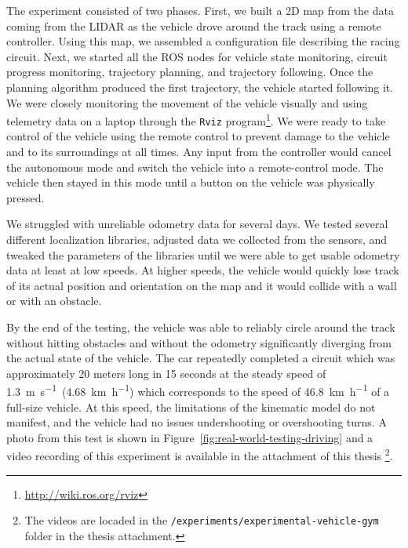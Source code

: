 The experiment consisted of two phases. First, we built a 2D map from the data coming from the \gls*{LIDAR} as the vehicle drove around the track using a remote controller. Using this map, we assembled a configuration file describing the racing circuit. Next, we started all the \gls{ROS} nodes for vehicle state monitoring, circuit progress monitoring, trajectory planning, and trajectory following. Once the planning algorithm produced the first trajectory, the vehicle started following it. We were closely monitoring the movement of the vehicle visually and using telemetry data on a laptop through the \texttt{Rviz} program\footnote{\url{http://wiki.ros.org/rviz}}. We were ready to take control of the vehicle using the remote control to prevent damage to the vehicle and to its surroundings at all times. Any input from the controller would cancel the autonomous mode and switch the vehicle into a remote-control mode. The vehicle then stayed in this mode until a button on the vehicle was physically pressed.

We struggled with unreliable odometry data for several days. We tested several different localization libraries, adjusted data we collected from the sensors, and tweaked the parameters of the libraries until we were able to get usable odometry data at least at low speeds. At higher speeds, the vehicle would quickly lose track of its actual position and orientation on the map and it would collide with a wall or with an obstacle.

By the end of the testing, the vehicle was able to reliably circle around the track without hitting obstacles and without the odometry significantly diverging from the actual state of the vehicle. The car repeatedly completed a circuit which was approximately 20 meters long in 15 seconds at the steady speed of \SI{1.3}{\meter\per\second}~(\SI{4.68}{\kilo\meter\per\hour}) which corresponds to the speed of \SI{46.8}{\kilo\meter\per\hour} of a full-size vehicle. At this speed, the limitations of the kinematic model do not manifest, and the vehicle had no issues undershooting or overshooting turns. A photo from this test is shown in Figure~\ref{fig:real-world-testing-driving} and a video recording of this experiment is available in the attachment of this thesis \footnote{The videos are locaded in the \texttt{/experiments/experimental-vehicle-gym} folder in the thesis attachment.}.

